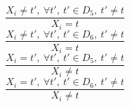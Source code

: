 $$\frac{X_{i} \neq t',~\forall t',~t' \in D_{5},~t' \neq t}{X_{i}=t}$$ $$\frac{X_{i} \neq t',~\forall t',~t' \in D_{6},~t' \neq t}{X_{i}=t}$$ $$\frac{X_{i}=t',~\forall t',~t' \in D_{5},~t' \neq t}{X_{i} \neq t}$$ $$\frac{X_{i}=t',~\forall t',~t' \in D_{6},~t' \neq t}{X_{i} \neq t}$$ 